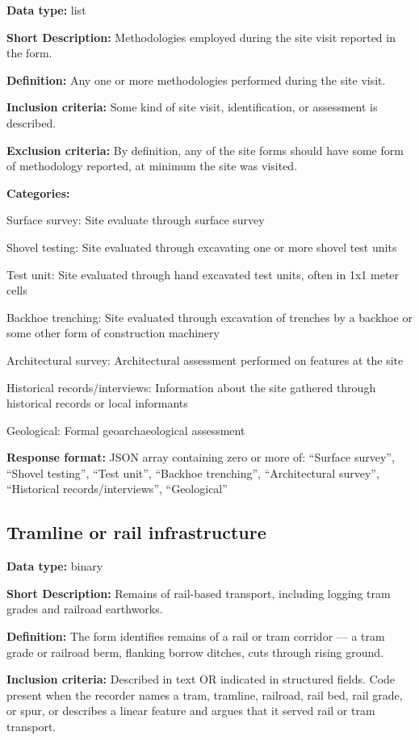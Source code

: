 \documentclass[
]{article}
\begin{document}
\textbf{Data type:} list

\textbf{Short Description:} Methodologies employed during the site visit
reported in the form.

\textbf{Definition:} Any one or more methodologies performed during the
site visit.

\textbf{Inclusion criteria:} Some kind of site visit, identification, or
assessment is described.

\textbf{Exclusion criteria:} By definition, any of the site forms should
have some form of methodology reported, at minimum the site was visited.

\textbf{Categories:}

Surface survey: Site evaluate through surface survey

Shovel testing: Site evaluated through excavating one or more shovel
test units

Test unit: Site evaluated through hand excavated test units, often in
1x1 meter cells

Backhoe trenching: Site evaluated through excavation of trenches by a
backhoe or some other form of construction machinery

Architectural survey: Architectural assessment performed on features at
the site

Historical records/interviews: Information about the site gathered
through historical records or local informants

Geological: Formal geoarchaeological assessment

\textbf{Response format:} JSON array containing zero or more of:
``Surface survey'', ``Shovel testing'', ``Test unit'', ``Backhoe
trenching'', ``Architectural survey'', ``Historical
records/interviews'', ``Geological''

\subsection{Tramline or rail
infrastructure}\label{tramline-or-rail-infrastructure}

\textbf{Data type:} binary

\textbf{Short Description:} Remains of rail-based transport, including
logging tram grades and railroad earthworks.

\textbf{Definition:} The form identifies remains of a rail or tram
corridor --- a tram grade or railroad berm, flanking borrow ditches,
cuts through rising ground.

\textbf{Inclusion criteria:} Described in text OR indicated in
structured fields. Code present when the recorder names a tram,
tramline, railroad, rail bed, rail grade, or spur, or describes a linear
feature and argues that it served rail or tram transport.
\end{document}
